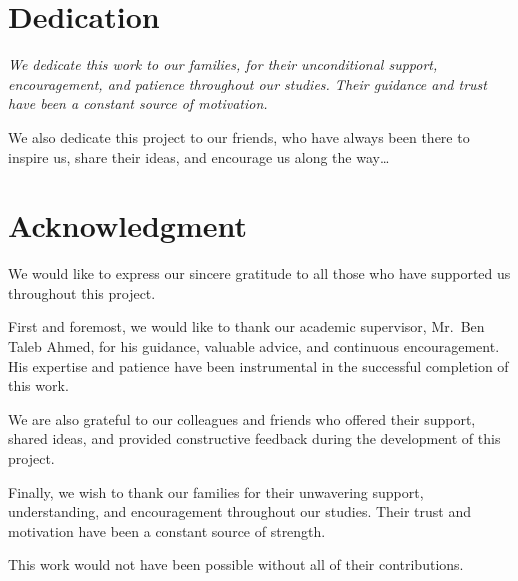 \documentclass[a4paper, oneside, 12pt, final]{extreport}
\begin{document}
\chapter*{Dedication}
\thispagestyle{empty}

\begin{center}
{\it
We dedicate this work to our families, for their unconditional support, encouragement,
and patience throughout our studies. Their guidance and trust have been a constant
source of motivation.

We also dedicate this project to our friends, who have always been there to inspire us,
share their ideas, and encourage us along the way\ldots
}
\end{center}

\chapter*{Acknowledgment}
\thispagestyle{empty}

We would like to express our sincere gratitude to all those who have supported us
throughout this project.

First and foremost, we would like to thank our academic supervisor, Mr.\ Ben Taleb Ahmed,
for his guidance, valuable advice, and continuous encouragement. His expertise and
patience have been instrumental in the successful completion of this work.

We are also grateful to our colleagues and friends who offered their support, shared ideas,
and provided constructive feedback during the development of this project.

Finally, we wish to thank our families for their unwavering support, understanding, and
encouragement throughout our studies. Their trust and motivation have been a constant
source of strength.

This work would not have been possible without all of their contributions.

\tableofcontents
\listoffigures
\listoftables
\printglossaries

\cleardoublepage
\newpage
{}
\end{document}

